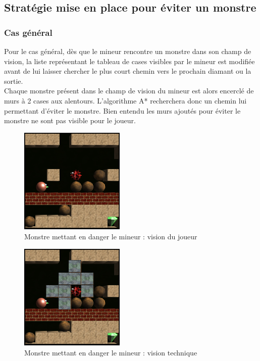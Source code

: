 \documentclass[a4paper,11pt]{article}
\begin{document}
	\newpage
	\subsection{Strat\'egie mise en place pour \'eviter un monstre}
	
		\subsubsection{Cas g\'en\'eral}
		
		Pour le cas g\'en\'eral, d\`es que le mineur rencontre un monstre dans son champ de vision, la liste repr\'esentant le tableau de cases visibles par le mineur est modifi\'ee avant de lui laisser chercher le plus court chemin vers le prochain diamant ou la sortie.\\
Chaque monstre pr\'esent dans le champ de vision du mineur est alors encercl\'e de murs \`a 2 cases aux alentours. L'algorithme A* recherchera donc un chemin lui permettant d'\'eviter le monstre. Bien entendu les murs ajout\'es pour \'eviter le monstre ne sont pas visible pour le joueur.

		\begin{figure}[h]
			\center
			\includegraphics[width=5cm]{monstre1}
			\caption{\label{monstre1} Monstre mettant en danger le mineur : vision du joueur}
		\end{figure}
		
		\begin{figure}[h]
			\center
			\includegraphics[width=5cm]{monstre2}
			\caption{\label{monstre2} Monstre mettant en danger le mineur : vision technique }
		\end{figure}
		
\end{document}
